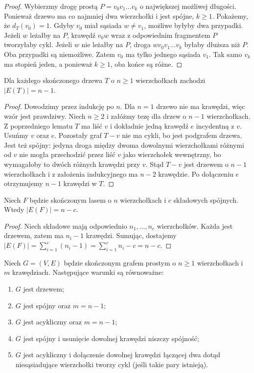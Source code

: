 \begin{proof}
Wybierzmy drogę prostą $P=v_0v_1\ldots v_k$
o największej możliwej długości. Ponieważ drzewo
ma co najmniej dwa wierzchołki i jest spójne,
$k\ge1$. Pokażemy, że $d_T(v_0)=1$.
Gdyby $v_0$ miał sąsiada $w\ne v_1$, możliwe
byłyby dwa przypadki. Jeżeli $w$ leżałby na
$P$, krawędź $v_0w$ wraz z odpowiednim fragmentem
$P$ tworzyłaby cykl. Jeżeli $w$ nie leżałby
na $P$, droga $wv_0v_1\ldots v_k$ byłaby
dłuższa niż $P$. Oba przypadki są niemożliwe.
Zatem $v_0$ ma tylko jednego sąsiada $v_1$.
Tak samo $v_k$ ma stopień jeden, a ponieważ
$k\ge1$, oba końce są różne.
\end{proof}

\begin{twierdzenie}
Dla każdego skończonego drzewa $T$ o $n\ge1$
wierzchołkach zachodzi $|E(T)|=n-1$.
\end{twierdzenie}

\begin{proof}
Dowodzimy przez indukcję po $n$. Dla $n=1$
drzewo nie ma krawędzi, więc wzór jest prawdziwy.
Niech $n\ge2$ i załóżmy tezę dla drzew o $n-1$
wierzchołkach. Z poprzedniego lematu $T$ ma
liść $v$ i dokładnie jedną krawędź $e$ incydentną
z $v$. Usuńmy $v$ oraz $e$. Pozostały graf $T-v$
nie ma cykli, bo jest podgrafem drzewa. Jest
też spójny: jedyna droga między dwoma dowolnymi
wierzchołkami różnymi od $v$ nie mogła przechodzić
przez liść $v$ jako wierzchołek wewnętrzny, bo
wymagałoby to dwóch różnych krawędzi przy $v$.
Stąd $T-v$ jest drzewem o $n-1$ wierzchołkach
i z założenia indukcyjnego ma $n-2$ krawędzie.
Po dołączeniu $e$ otrzymujemy $n-1$ krawędzi w $T$.
\end{proof}

\begin{wniosek}
Niech $F$ będzie skończonym lasem o $n$ wierzchołkach
i $c$ składowych spójnych. Wtedy $|E(F)|=n-c$.
\end{wniosek}

\begin{proof}
Niech składowe mają odpowiednio $n_1,\ldots,n_c$
wierzchołków. Każda jest drzewem, zatem ma
$n_i-1$ krawędzi. Sumując, dostajemy
$|E(F)|=\sum_{i=1}^{c}(n_i-1)
=\sum_{i=1}^{c}n_i-c=n-c$.
\end{proof}

\begin{twierdzenie}
Niech $G=(V,E)$ będzie skończonym grafem prostym
o $n\ge1$ wierzchołkach i $m$ krawędziach.
Następujące warunki są równoważne:
\begin{enumerate}[label=(\roman*)]
\item $G$ jest drzewem;
\item $G$ jest spójny oraz $m=n-1$;
\item $G$ jest acykliczny oraz $m=n-1$;
\item $G$ jest spójny i usunięcie dowolnej
krawędzi niszczy spójność;
\item $G$ jest acykliczny i dołączenie dowolnej
krawędzi łączącej dwa dotąd niesąsiadujące
wierzchołki tworzy cykl (jeśli takie pary istnieją).
\end{enumerate}
\end{twierdzenie}

